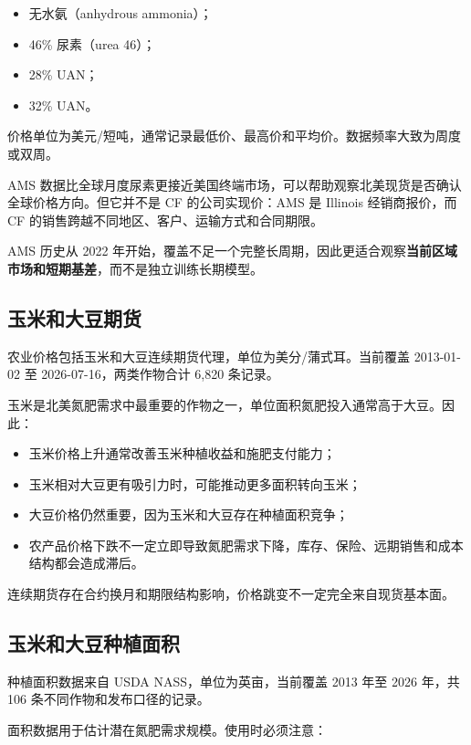 \documentclass[11pt,a4paper]{ctexart}
\begin{document}
\begin{itemize}
  \item 无水氨（anhydrous ammonia）；
  \item 46\% 尿素（urea 46）；
  \item 28\% UAN；
  \item 32\% UAN。
\end{itemize}

价格单位为美元/短吨，通常记录最低价、最高价和平均价。数据频率大致为周度或双周。

AMS 数据比全球月度尿素更接近美国终端市场，可以帮助观察北美现货是否确认全球价格方向。但它并不是 CF 的公司实现价：AMS 是 Illinois 经销商报价，而 CF 的销售跨越不同地区、客户、运输方式和合同期限。

AMS 历史从 2022 年开始，覆盖不足一个完整长周期，因此更适合观察\textbf{当前区域市场和短期基差}，而不是独立训练长期模型。

\subsection{玉米和大豆期货}

农业价格包括玉米和大豆连续期货代理，单位为美分/蒲式耳。当前覆盖 2013-01-02 至 2026-07-16，两类作物合计 6,820 条记录。

玉米是北美氮肥需求中最重要的作物之一，单位面积氮肥投入通常高于大豆。因此：

\begin{itemize}
  \item 玉米价格上升通常改善玉米种植收益和施肥支付能力；
  \item 玉米相对大豆更有吸引力时，可能推动更多面积转向玉米；
  \item 大豆价格仍然重要，因为玉米和大豆存在种植面积竞争；
  \item 农产品价格下跌不一定立即导致氮肥需求下降，库存、保险、远期销售和成本结构都会造成滞后。
\end{itemize}

连续期货存在合约换月和期限结构影响，价格跳变不一定完全来自现货基本面。

\subsection{玉米和大豆种植面积}

种植面积数据来自 USDA NASS，单位为英亩，当前覆盖 2013 年至 2026 年，共 106 条不同作物和发布口径的记录。

面积数据用于估计潜在氮肥需求规模。使用时必须注意：
\end{document}
